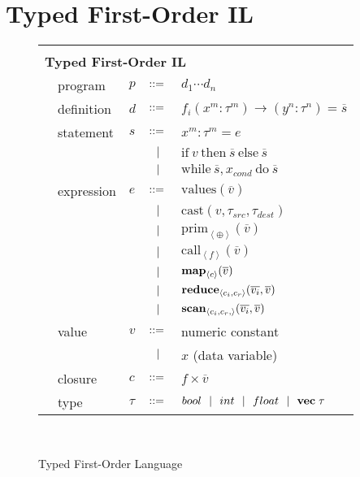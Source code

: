 \documentclass[preprint]{sigplanconf}
\begin{document}
\section{Typed First-Order IL}
\begin{figure}[h!]
  \begin{tabular}{| m{0.01cm}m{1.3cm}m{0.1cm}m{0.2cm}p{5.0cm} |}
  \hline
    & & & &\\
   \multicolumn{5}{|l|}{\textbf{Typed First-Order IL}}  \\[4pt]
  & program & $p$ &  $::=$   &  $d_1 \cdots d_n $ \\[4pt]
  & definition & $d$ & $::=$ & $f_i(x^m : \tau^m) \rightarrow (y^n : \tau^n) = \overline{s} $ \\[4pt]
  & statement  & $s$ & $::=$ & $x^m : \tau^m = e $\\[2pt]
  &            &     & $\ \ | \ \ $    & $\mathrm{if} ~v~ \mathrm{then} ~\overline{s}~ \mathrm{else} ~ \overline{s}$ \\[2pt]
  &            &     & $\ \ | \ \ $    & $\mathrm{while} ~ \overline{s}, x_{cond} ~ \mathrm{do} ~ \overline{s} ~  $ \\[4pt]
  & expression & $e$ & $::=$ & $\mathrm{values}(\overline{v})$ \\[2pt]
  &            &     & $\ \ | \ \ $    & $\mathrm{cast} (v, \tau_{src}, \tau_{dest})$ \\[2pt]
  &            &     & $\ \ | \ \ $    & $\mathrm{prim}_{\left\langle \oplus \right\rangle }(\overline{v})$ \\[2pt]
  &            &     & $\ \ | \ \ $    & $\mathrm{call}_{\left\langle f  \right\rangle } (\overline{v})$ \\[2pt] 
  &            &     & $\ \ | \ \ $    & $\mbox{\textbf{map}} _{\left\langle c \right\rangle}(\overline{v})$ \\[2pt]
  &            &     & $\ \ | \ \ $    & $\mbox{\textbf{reduce}} _{ \left\langle c_i, c_r \right\rangle } (\overline{v_i}, \overline{v})$ \\[2pt]
  &            &     & $\ \ | \ \ $    & $\mbox{\textbf{scan}} _{ \left\langle c_i, c_r, \right\rangle} (\overline{v_i}, \overline{v})$ \\[5pt]
  & value      & $v$ & $::=$ & numeric constant \\[2pt]
  &            &     & $\ \ | \ \ $    &  $x$  \quad \small{(data variable)} \\[2pt]
  & closure    & $c$ & $::=$ & $f \times \overline{v}$ \\[4pt]
  & type & $\tau$    & $::=$ & $bool \ \ | \ \  int \ \ | \ \  float \ \ | \ \  \mathbf{vec} \; \tau   $\\[5pt]
  \hline
  \end{tabular}\\[4pt]
  \caption{Typed First-Order Language}
\end{figure} 
\end{document}
